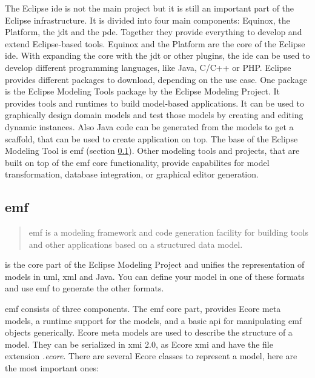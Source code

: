   The Eclipse \ac{ide} is not the main project but it is still an important part of the Eclipse infrastructure. It is divided into four main components: Equinox, the Platform, the \ac{jdt} and the \ac{pde}. Together they provide everything to develop and extend Eclipse-based tools. Equinox and the Platform are the core of the Eclipse \ac{ide}. With expanding the core with the \ac{jdt} or other plugins, the \ac{ide} can be used to develop different programming languages, like Java, C/C++ or PHP. \cite{emf} Eclipse provides different packages to download, depending on the use case. One package is the Eclipse Modeling Tools package by the Eclipse Modeling Project. It provides tools and runtimes to build model-based applications. It can be used to graphically design domain models and test those models by creating and editing dynamic instances. Also Java code can be generated from the models to get a scaffold, that can be used to create application on top. \cite{eclipse_modeling} The base of the Eclipse Modeling Tool is \ac{emf} (section \ref{subsec:emf}). Other modeling tools and projects, that are built on top of the \ac{emf} core functionality, provide capabilites for model transformation, database integration, or graphical editor generation. \cite{emf}

  \subsection{\acf{emf}}
    \label{subsec:emf}

    \begin{quote}
      \glqq\acf{emf} is a modeling framework and code generation facility for building tools and other applications based on a structured data model.\grqq{} \autocite{emf-repo}
    \end{quote}

     is the core part of the Eclipse Modeling Project and unifies the representation of models in \acs{uml}, \acs{xml} and Java. You can define your model in one of these formats and use \ac{emf} to generate the other formats.
    
    \ac{emf} consists of three components. The \ac{emf} core part, provides Ecore meta models, a runtime support for the models, and a basic \acs{api} for manipulating \ac{emf} objects generically. Ecore meta models are used to describe the structure of a model. \cite{eclipse_emf} They can be serialized in \ac{xmi} 2.0, as Ecore \ac{xmi} and have the file extension \textit{.ecore}. There are several Ecore classes to represent a model, here are the most important ones:


